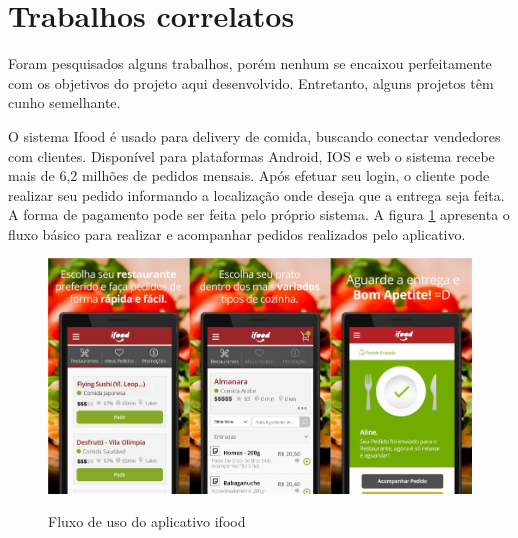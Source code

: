 \section{Trabalhos correlatos}
\label{sec:java}

Foram pesquisados alguns trabalhos, porém nenhum se encaixou perfeitamente com os objetivos do projeto aqui desenvolvido. Entretanto, alguns projetos têm cunho semelhante. \par
O sistema Ifood é usado para delivery de comida, buscando conectar vendedores com clientes. Disponível para plataformas Android, IOS e web o sistema recebe mais de 6,2 milhões de pedidos mensais\cite{bastos2018marketing}. Após efetuar seu login, o cliente pode realizar seu pedido informando a localização onde deseja que a entrega seja feita. A forma de pagamento pode ser feita pelo próprio sistema. A figura \ref{fig:ifood} apresenta o fluxo básico para realizar e acompanhar pedidos realizados pelo aplicativo.

\begin{figure}[htbp!]
  \centering
  \caption{Fluxo de uso do aplicativo ifood}
  \includegraphics[width=1\textwidth]{figs/ifood2.jpg}
    \label{fig:ifood}
\end{figure}